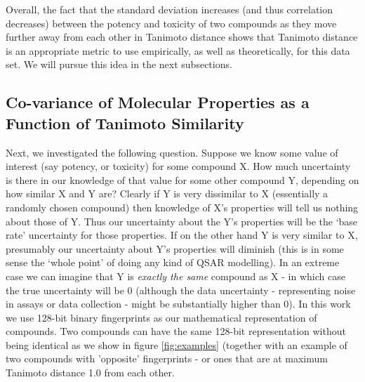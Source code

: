 \documentclass{article}
\begin{document}
Overall, the fact that the standard deviation increases (and thus correlation decreases) between the potency and toxicity of two compounds as they move further away from each other in Tanimoto distance shows that Tanimoto distance is an appropriate metric to use empirically, as well as theoretically, for this data set.  We will pursue this idea in the next subsections.  


\subsection{Co-variance of Molecular Properties as a Function of Tanimoto Similarity}

Next, we investigated the following question.  Suppose we know some value of interest (say potency, or toxicity) for some compound X.  How much uncertainty is there in our knowledge of that value for some other compound Y, depending on how similar X and Y are?
\newline
\newline
Clearly if Y is very dissimilar to X (essentially a randomly chosen compound) then knowledge of X's properties will tell us nothing about those of Y. Thus our uncertainty about the Y's properties will be the `base rate' uncertainty for those properties. If on the other hand Y is very similar to X, presumably our uncertainty about Y's properties will diminish (this is in some sense the `whole point' of doing any kind of QSAR modelling).  In an extreme case we can imagine that Y is \textit{exactly the same} compound as X - in which case the true uncertainty will be 0 (although the data uncertainty - representing noise in assays or data collection - might be substantially higher than 0).  In this work we use 128-bit binary fingerprints as our mathematical representation of compounds.  Two compounds can have the same 128-bit representation without being identical as we show in figure \ref{fig:examples} (together with an example of two compounds with 'opposite' fingerprints - or ones that are at maximum Tanimoto distance 1.0 from each other.
\end{document}
